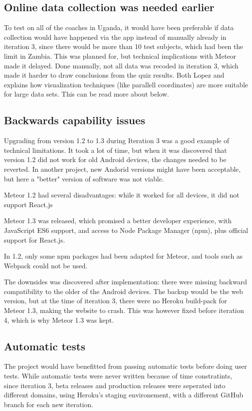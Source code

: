 \subsection{Online data collection was needed earlier}
To test on all of the coaches in Uganda, it would have been preferable if data collection would have happened via the app instead of manually already in iteration 3, since there would be more than 10 test subjects, which had been the limit in Zambia. This was planned for, but technical implications with Meteor made it delayed. Done manually, not all data was recoded in iteration 3, which made it harder to draw conclusions from the quiz results. Both Lopez \cite{une-terre} and \cite{ropinski} explains how visualization techniques (like parallell coordinates) are more suitable for large data sets. This can be read more about below.

\subsection{Backwards capability issues} \label{backwards-capability}
Upgrading from version 1.2 to 1.3 during Iteration 3 was a good example of technical limitations. It took a lot of time, but when it was discovered that version 1.2 did not work for old Android devices, the changes needed to be reverted. In another project, new Andorid versions might have been acceptable, but here a "better" version of software was not viable.

Meteor 1.2 had several disadvantages: while it worked for all devices, it did not support React.js

Meteor 1.3 was released, which promised a better developer experience, with JavaScript ES6 support, and access to Node Package Manager (npm), plus official support for React.js.

In 1.2, only some npm packages had been adapted for Meteor, and tools such as Webpack could not be used.

The downsides was discovered after implementation: there were missing backward compatibility to the older of the Android devices. The backup would be the web version, but at the time of iteration 3, there were no Heroku build-pack for Meteor 1.3, making the website to crash. This was however fixed before iteration 4, which is why Meteor 1.3 was kept.

\subsection{Automatic tests}
The project would have benefitted from passing automatic tests before doing user tests. While automatic tests were never written because of time constratints, since iteration 3, beta releases and production releases were seperated into different domains, using Heroku's staging environement, with a different GitHub branch for each new iteration.

